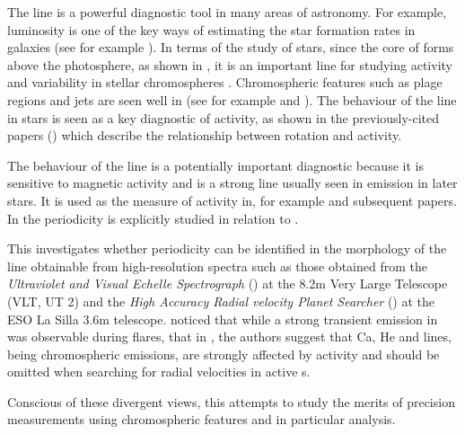 The {\ha} line is a powerful diagnostic tool in many areas of astronomy. For example, {\ha} luminosity is one of the key
ways of estimating the star formation rates in galaxies (see for example \citet{rosagonzalez02}).
In terms of the study of stars, since the core of {\ha} forms above the photosphere, as shown in \citet{vernazza81}, it
is an important line for studying activity and variability in stellar chromospheres \citep{hall08}. Chromospheric
features such as plage regions and jets are seen well in {\ha} (see for example \citet{kneer10} and \citet{kuridze11}).
The behaviour of the {\ha} line in {\rdwarf} stars is seen as a key diagnostic of activity, as shown in the
previously-cited papers (\citealt{mohanty02, mohanty03, reiners08, schmidt14}) which describe the relationship between
rotation and activity.

The behaviour of the {\ha} line is a potentially important diagnostic because it is sensitive to magnetic activity and
is a strong line usually seen in emission in later {\rdwarf} stars. It is used as the measure of activity in, for
example \citet{mohanty03} and subsequent papers. In \citet{hatzes15} the {\ha} periodicity is explicitly studied in
relation to .

This {\paperorthesis} investigates whether periodicity can be identified in the morphology of the {\ha} line obtainable
from high-resolution spectra such as those obtained from the \textit{Ultraviolet and Visual Echelle Spectrograph}
({\uves}) at the 8.2m Very Large Telescope (VLT, UT 2) and the \textit{High Accuracy Radial velocity Planet Searcher}
({\harps}) at the ESO La Silla 3.6m telescope. \citet{barnes14} noticed that while a strong transient emission in {\ha}
was observable during flares,  that in \citet{reiners09}, the authors suggest that Ca, He and
{\ha} lines, being chromospheric emissions, are strongly affected by activity and should be omitted when searching for
radial velocities in active \rdwarf s.

Conscious of these divergent views, this {\paperorthesis} attempts to study the merits of precision measurements using
chromospheric features and in particular {\ha} analysis.

\section{\prox}
\protect\label{section:introprox}

